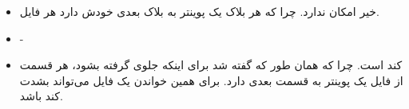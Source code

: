 \begin{itemize}
    \item خیر امکان ندارد. چرا که هر بلاک یک پوینتر به بلاک بعدی خودش دارد هر فایل.
    \item -
    \item کند است. چرا که همان طور که گفته شد برای اینکه جلوی
    گرفته بشود، هر قسمت از فایل یک پوینتر به قسمت بعدی دارد. برای همین خواندن یک فایل می‌تواند بشدت کند
    باشد.
\end{itemize}